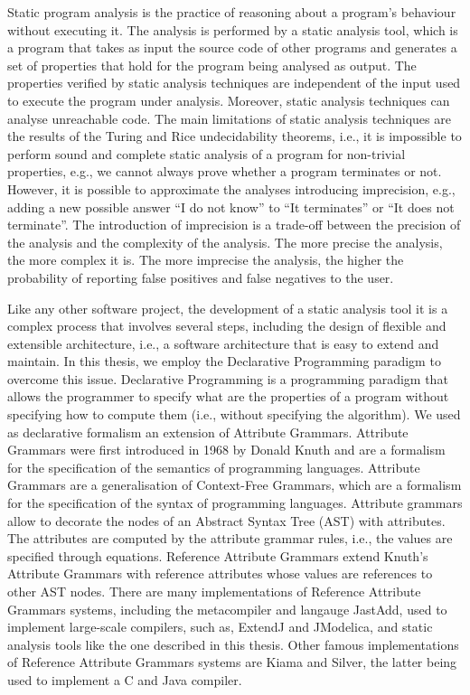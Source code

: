 Static program analysis is the practice of reasoning about a program's behaviour without executing it.
The analysis is performed by a static analysis tool,
which is a program that takes as input the source code of other programs and
generates a set of properties that hold for the program being analysed as output.
The properties verified by static analysis techniques are independent of the input
used to execute the program under analysis. Moreover, static analysis techniques can analyse unreachable code.
The main limitations of static analysis techniques are the results of the Turing and Rice undecidability
theorems, i.e., it is impossible to perform sound and complete static analysis of a program for non-trivial properties, e.g., 
we cannot always prove whether a program terminates or not. However, it is possible
to approximate the analyses introducing imprecision, e.g., adding a new possible answer
``I do not know'' to  ``It terminates'' or ``It does not terminate''. The introduction 
of imprecision is a trade-off between the precision of the analysis and the complexity
of the analysis. The more precise the analysis, the more complex it is. 
The more imprecise the analysis, the higher the probability of reporting 
false positives and false negatives to the user. 

Like any other software project, the development of a static analysis tool
it is a complex process that involves several steps, including the design of 
flexible and extensible architecture, i.e., a software architecture that is 
easy to extend and maintain. In this thesis, we employ the Declarative Programming
paradigm to overcome this issue. Declarative Programming is a programming 
paradigm that allows the programmer to specify what are the properties of a
program without specifying how to compute them (i.e., without specifying the 
algorithm). We used as declarative formalism an extension of Attribute Grammars. Attribute Grammars
were first introduced in 1968 by Donald Knuth and are a formalism for the specification
of the semantics of programming languages. Attribute Grammars are a generalisation
of Context-Free Grammars, which are a formalism for the specification of the syntax
of programming languages. 
Attribute grammars allow to decorate the nodes of an Abstract Syntax Tree (AST) with attributes. 
The attributes are computed by the attribute grammar rules, i.e., the values are specified
through equations. Reference Attribute Grammars extend Knuth's Attribute Grammars
with reference attributes whose values are references to other AST nodes. 
There are many implementations of Reference Attribute Grammars systems, including
the metacompiler and langauge JastAdd, used to implement large-scale compilers, such as,
ExtendJ and JModelica, and static analysis tools like the one described in this thesis.
Other famous implementations of Reference Attribute Grammars systems are Kiama and Silver, 
the latter being used to implement a C and Java compiler.

